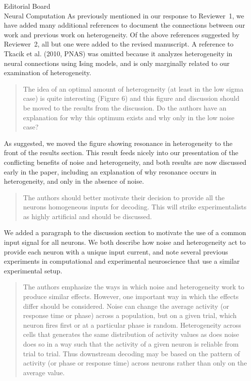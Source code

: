 \documentclass[]{letter}
\begin{document}
\begin{letter}{Editorial Board\\Neural Computation}
As previously mentioned in our response to Reviewer~1, we have added many additional references to document the connections between our work and previous work on heterogeneity. Of the above references suggested by Reviewer~2, all but one were added to the revised manuscript. A reference to Tkacik et al. (2010, PNAS) was omitted because it analyzes heterogeneity in neural connections using Ising models, and is only marginally related to our examination of heterogeneity.

\begin{quotation}
  The idea of an optimal amount of heterogeneity (at least in the low sigma case) is quite interesting (Figure 6) and this figure and discussion should be moved to the results from the discussion.  Do the authors have an explanation for why this optimum exists and why only in the low noise case?
\end{quotation}

As suggested, we moved the figure showing resonance in heterogeneity to the front of the results section. This result feeds nicely into our presentation of the conflicting benefits of noise and heterogeneity, and both results are now discussed early in the paper, including an explanation of why resonance occurs in heterogeneity, and only in the absence of noise.

\begin{quotation}
  The authors should better motivate their decision to provide all the neurons homogeneous inputs for decoding.  This will strike experimentalists as highly artificial and should be discussed.
\end{quotation}

We added a paragraph to the discussion section to motivate the use of a common input signal for all neurons. We both describe how noise and heterogeneity act to provide each neuron with a unique input current, and note several previous experiments in computational and experimental neuroscience that use a similar experimental setup.

\begin{quotation}
  The authors emphasize the ways in which noise and heterogeneity work to produce similar effects.  However, one important way in which the effects differ should be considered.  Noise can change the average activity (or response time or phase) across a population, but on a given trial, which neuron fires first or at a particular phase is random.  Heterogeneity across cells that generates the same distribution of activity values as does noise does so in a way such that the activity of a given neuron is reliable from trial to trial.  Thus downstream decoding may be based on the pattern of activity (or phase or response time) across neurons rather than only on the average value.
\end{quotation}


\end{letter}
\end{document}

